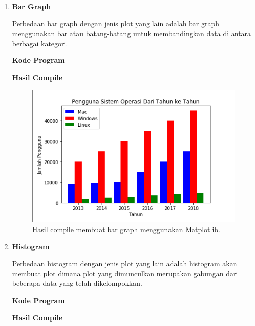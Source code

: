\begin{enumerate}
	\item \textbf{Bar Graph}
	
	Perbedaan bar graph dengan jenis plot yang lain adalah bar graph menggunakan bar atau batang-batang untuk membandingkan data di antara berbagai kategori.
	
	\textbf{Kode Program}
	
	
	
	\textbf{Hasil Compile}
	
	\begin{figure}[H]
		\includegraphics[width=12cm]{figures/6/1174089/Teori/bar.png}
		\centering
		\caption{Hasil compile membuat bar graph menggunakan Matplotlib.}
	\end{figure}
	
	\item \textbf{Histogram}
	
	Perbedaan histogram dengan jenis plot yang lain adalah histogram akan membuat plot dimana plot yang dimunculkan merupakan gabungan dari beberapa data yang telah dikelompokkan.
	
	\textbf{Kode Program}
	
	
	
	\textbf{Hasil Compile}
	

\end{enumerate}
